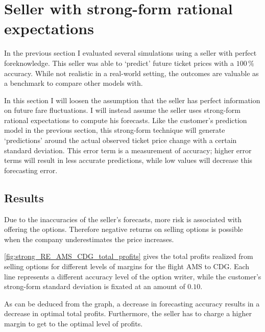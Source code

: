 \section{Seller with strong-form rational expectations}
\label{sec:StrongWeak}
In the previous section I evaluated several simulations using a seller with perfect foreknowledge. This seller was able to `predict' future ticket prices with a $100\,\%$ accuracy. While not realistic in a real-world setting, the outcomes are valuable as a benchmark to compare other models with.

In this section I will loosen the assumption that the seller has perfect information on future fare fluctuations. I will instead assume the seller uses strong-form rational expectations to compute his forecasts. Like the customer's prediction model in the previous section, this strong-form technique will generate `predictions' around the actual observed ticket price change with a certain standard deviation. This error term is a measurement of accuracy; higher error terms will result in less accurate predictions, while low values will decrease this forecasting error.

\subsection{Results}
Due to the inaccuracies of the seller's forecasts, more risk is associated with offering the options. Therefore negative returns on selling options is possible when the company underestimates the price increases.

\autoref{fig:strong_RE_AMS_CDG_total_profits} gives the total profits realized from selling options for different levels of margins for the flight AMS to CDG. Each line represents a different accuracy level of the option writer, while the customer's strong-form standard deviation is fixated at an amount of $0.10$.


As can be deduced from the graph, a decrease in forecasting accuracy results in a decrease in optimal total profits. Furthermore, the seller has to charge a higher margin to get to the optimal level of profits.

